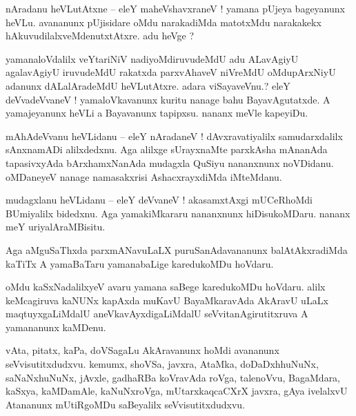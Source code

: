 \documentclass{article}
\begin{document}

\begin{mn}%
nAradanu heVLutAtxne -- eleY maheVshavxraneV ! yamana pUjeya bageyanunx heVLu. avananunx pUjisidare 
oMdu narakadiMda matotxMdu narakakekx hAkuvudilalxveMdenutxtAtxre. adu heVge ?
\end{mn}

\begin{mn}%
yamanaloVdalilx veYtariNiV nadiyoMdiruvudeMdU adu ALavAgiyU agalavAgiyU iruvudeMdU rakatxda 
parxvAhaveV niVreMdU oMdupArxNiyU adanunx dALalAradeMdU heVLutAtxre. adara viSayaveVnu.? eleY 
deVvadeVvaneV ! yamaloVkavanunx kuritu nanage bahu BayavAgutatxde. A yamajeyanunx heVLi a 
Bayavanunx tapipxsu. nananx meVle kapeyiDu.
\end{mn}

\begin{mn}%
mAhAdeVvanu heVLidanu -- eleY nAradaneV ! dAvxravatiyalilx samudarxdalilx sAnxnamADi alilxdedxnu. 
Aga alilxge sUrayxnaMte parxkAsha mAnanAda tapasivxyAda bArxhamxNanAda mudagxla QuSiyu nananxnunx 
noVDidanu. oMDaneyeV nanage namasakxrisi AshacxrayxdiMda iMteMdanu.
\end{mn}

\begin{mn}%
mudagxlanu heVLidanu -- eleY deVvaneV ! akasamxtAxgi mUCeRhoMdi BUmiyalilx bidedxnu. Aga 
yamakiMkararu nananxnunx hiDisukoMDaru. nananx meY uriyalAraMBisitu.
\end{mn}

\begin{mn}%
Aga aMguSaThxda parxmANavuLaLX puruSanAdavananunx balAtAkxradiMda kaTiTx A yamaBaTaru yamanabaLige 
karedukoMDu hoVdaru.
\end{mn}

\begin{mn}%
oMdu kaSxNadalilxyeV avaru yamana saBege karedukoMDu hoVdaru. alilx keMcagiruva kaNUNx kapAxda 
muKavU BayaMkaravAda AkAravU uLaLx maqtuyxgaLiMdalU aneVkavAyxdigaLiMdalU seVvitanAgirutitxruva A 
yamananunx kaMDenu.
\end{mn}

\begin{mn}%
vAta, pitatx, kaPa, doVSagaLu AkAravanunx hoMdi avananunx seVvisutitxdudxvu. kemumx, shoVSa, 
javxra, AtaMka, doDaDxhhuNuNx, saNaNxhuNuNx, jAvxle, gadhaRBa koVravAda roVga, talenoVvu, 
BagaMdara, kaSxya, kaMDamAle, kaNuNxroVga, mUtarxkaqcaCXrX javxra, gAya ivelalxvU Atananunx 
mUtiRgoMDu saBeyalilx seVvisutitxdudxvu.
\end{mn}
\end{document}
